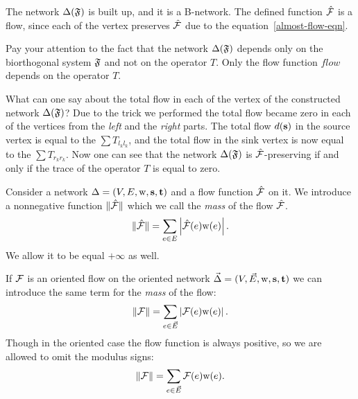 \documentclass[12pt]{amsart}
\begin{document}
    The network $\Delta(\mathfrak{F})$ is built up, and it is a B-network.
    The defined function $\mathcal{\hat{F}}$ is a flow, since each of the vertex preserves
      $\mathcal{\hat{F}}$ due to the equation~\eqref{almost-flow-eqn}.
    \begin{remark}
      Pay your attention to the fact that the network $\Delta(\mathfrak{F})$
        depends only on the biorthogonal system $\mathfrak{F}$ and not on the operator $T$.
      Only the flow function $flow$ depends on the operator $T$.
    \end{remark}
    What can one say about the total flow in each of the vertex of the constructed network $\Delta(\mathfrak{F})$?
    Due to the trick we performed the total flow became zero in each of the vertices from the \emph{left} and the \emph{right} parts.
    The total flow $d(\mathbf{s})$ in the source vertex is equal to the $\sum T_{l_k l_k}$, and the total flow in the
      sink vertex is now equal to the $\sum T_{r_k r_k}$.
    Now one can see that the network $\Delta(\mathfrak{F})$ is $\mathcal{\hat{F}}$-preserving if and only if the trace of the operator $T$ is equal to
      zero.
    \begin{definition}
      Consider a network $\Delta = (V, E, \mathrm{w}, \mathbf{s}, \mathbf{t})$ and a flow function $\mathcal{\hat{F}}$ on it.
      We introduce a nonnegative function $\|\mathcal{\hat{F}}\|$ which we call the \emph{mass} of the flow $\mathcal{\hat{F}}$.
      \[
        \|\mathcal{\hat{F}}\| = \sum_{e \in E} \left|\mathcal{\hat{F}}(e) \mathrm{w}(e)\right|.
      \]
      We allow it to be equal $+\infty$ as well.
    \end{definition}
    \begin{definition}
      If $\mathcal{F}$ is an oriented flow on the oriented network $\vec{\Delta} = (V,\vec{E},\mathrm{w}, \mathbf{s}, \mathbf{t})$ 
        we can introduce the same term for the \emph{mass} of the flow:
      \[
        \|\mathcal{F}\| = \sum_{e \in \vec{E}} \left|\mathcal{F}(e) \mathrm{w}(e)\right|.
      \]
      Though in the oriented case the flow function is always positive,
        so we are allowed to omit the modulus signs:
      \[
        \|\mathcal{F}\| = \sum_{e \in \vec{E}} \mathcal{F}(e) \mathrm{w}(e).
      \]
    \end{definition}
\end{document}
